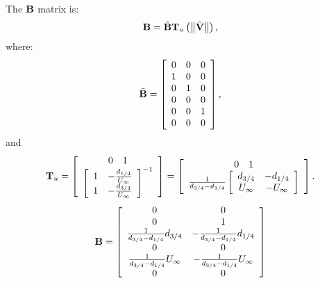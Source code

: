 The $\bm{\mathbf{B}}$ matrix is:
\begin{equation}
	\bm{\mathbf{B}} = \tilde{\bm{\mathbf{B}}} \bm{\mathbf{T}}_u \left( \left\| \tilde{\bm{\mathbf{V}}} \right\| \right),
\end{equation}
where:
\begin{equation}
	\tilde{\bm{\mathbf{B}}} = \left[
		\begin{array}{ccc}
			0 & 0 & 0 \\
			1 & 0 & 0 \\
			0 & 1 & 0 \\
			0 & 0 & 0 \\
			0 & 0 & 1 \\
			0 & 0 & 0 
		\end{array}
		\right],
\end{equation}
and
\begin{equation}
	\bm{\mathbf{T}}_u = \left[
		\begin{array}{c}
		\begin{array}{cc}
		0 & 1
		\end{array}\\ 
		\left[
		\begin{array}{cc}
			1 & -\frac{d_{1/4}}{U_\infty} \\
			1 & -\frac{d_{3/4}}{U_\infty} 
		\end{array}
		\right]^{-1}
		\end{array}
		\right] = \left[ 
		\begin{array}{c}
		\begin{array}{cc}
		0 & 1
		\end{array}\\
		\frac{1}{d_{3/4}-d_{1/4}} \left[  
		\begin{array}{cc}
			d_{3/4} & -{d_{1/4}} \\
			U_\infty & -U_\infty
		\end{array}
		\right]
		\end{array}
		\right].
\end{equation}
\begin{equation}
	\bm{\mathbf{B}} = \left[
		\begin{array}{cc}
		0 & 0 \\
		0 & 1 \\
		\frac{1}{d_{3/4}-d_{1/4}} d_{3/4} & 
		-\frac{1}{d_{3/4}-d_{1/4}} d_{1/4}\\ 
		0 & 0 \\
		\frac{1}{d_{3/4}-d_{1/4}} U_\infty & 
		-\frac{1}{d_{3/4}-d_{1/4}} U_\infty \\ 
		0 & 0
		\end{array}
		\right]
\end{equation}
		
